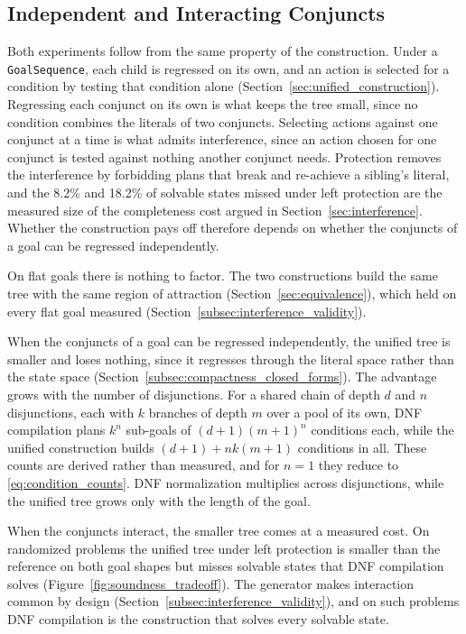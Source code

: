     \subsection{Independent and Interacting Conjuncts}
    \label{subsec:discussion_conjuncts}
    Both experiments follow from the same property of the construction.
    Under a \texttt{GoalSequence}, each child is regressed on its own, and an action is selected for a condition by testing that condition alone (Section~\ref{sec:unified_construction}).
    Regressing each conjunct on its own is what keeps the tree small, since no condition combines the literals of two conjuncts.
    Selecting actions against one conjunct at a time is what admits interference, since an action chosen for one conjunct is tested against nothing another conjunct needs.
    Protection removes the interference by forbidding plans that break and re-achieve a sibling's literal, and the 8.2\% and 18.2\% of solvable states missed under left protection are the measured size of the completeness cost argued in Section~\ref{sec:interference}.
    Whether the construction pays off therefore depends on whether the conjuncts of a goal can be regressed independently.
    
    On flat goals there is nothing to factor.
    The two constructions build the same tree with the same region of attraction (Section~\ref{sec:equivalence}), which held on every flat goal measured (Section~\ref{subsec:interference_validity}).

    When the conjuncts of a goal can be regressed independently, the unified tree is smaller and loses nothing, since it regresses through the literal space rather than the state space (Section~\ref{subsec:compactness_closed_forms}).
    The advantage grows with the number of disjunctions.
    For a shared chain of depth $d$ and $n$ disjunctions, each with $k$ branches of depth $m$ over a pool of its own, DNF compilation plans $k^n$ sub-goals of $(d+1)(m+1)^n$ conditions each, while the unified construction builds $(d+1) + nk(m+1)$ conditions in all.
    These counts are derived rather than measured, and for $n = 1$ they reduce to \eqref{eq:condition_counts}.
    DNF normalization multiplies across disjunctions, while the unified tree grows only with the length of the goal.

    When the conjuncts interact, the smaller tree comes at a measured cost.
    On randomized problems the unified tree under left protection is smaller than the reference on both goal shapes but misses solvable states that DNF compilation solves (Figure~\ref{fig:soundness_tradeoff}).
    The generator makes interaction common by design (Section~\ref{subsec:interference_validity}), and on such problems DNF compilation is the construction that solves every solvable state.

